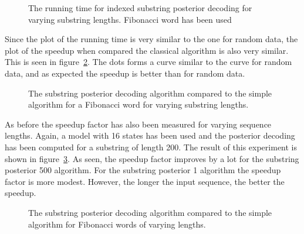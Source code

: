 \begin{figure}
  \centering
  
  \caption{The running time for indexed substring posterior decoding for
    varying substring lengths. Fibonacci word has been used}
  \label{fig:assymptotic_indexed_posterior_fib_subseq_length.tex}
\end{figure}

Since the plot of the running time is very similar to the one for random data,
the plot of the speedup when compared the classical algorithm is also very
similar. This is seen in
figure~\ref{fig:fib_indexed_posterior_speedup_vs_subseq}. The dots forms a
curve similar to the curve for random data, and as expected the speedup is
better than for random data.

\begin{figure}
  \centering
  
  \caption{The substring posterior decoding algorithm compared to the simple
    algorithm for a Fibonacci word for varying substring lengths.}
  \label{fig:fib_indexed_posterior_speedup_vs_subseq}
\end{figure}

As before the speedup factor has also been measured for varying sequence
lengths. Again, a model with 16 states has been used and the posterior decoding
has been computed for a substring of length 200. The result of this experiment
is shown in figure~\ref{fig:indexed_posterior_fib_speedup_vs_T}. As seen, the
speedup factor improves by a lot for the substring posterior 500 algorithm. For
the substring posterior 1 algorithm the speedup factor is more modest. However,
the longer the input sequence, the better the speedup.

\begin{figure}
  \centering
  
  \caption{The substring posterior decoding algorithm compared to the simple
    algorithm for Fibonacci words of varying lengths.}
  \label{fig:indexed_posterior_fib_speedup_vs_T}
\end{figure}

